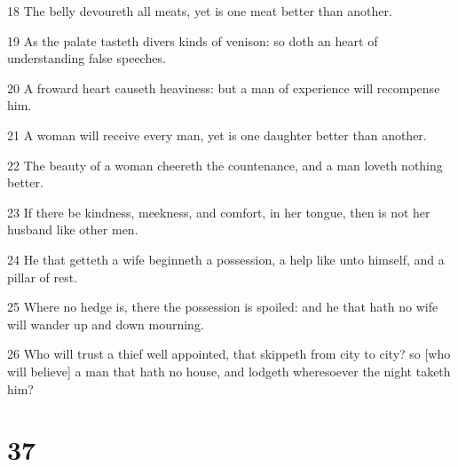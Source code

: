 \par 18 The belly devoureth all meats, yet is one meat better than another.
\par 19 As the palate tasteth divers kinds of venison: so doth an heart of understanding false speeches.
\par 20 A froward heart causeth heaviness: but a man of experience will recompense him.
\par 21 A woman will receive every man, yet is one daughter better than another.
\par 22 The beauty of a woman cheereth the countenance, and a man loveth nothing better.
\par 23 If there be kindness, meekness, and comfort, in her tongue, then is not her husband like other men.
\par 24 He that getteth a wife beginneth a possession, a help like unto himself, and a pillar of rest.
\par 25 Where no hedge is, there the possession is spoiled: and he that hath no wife will wander up and down mourning.
\par 26 Who will trust a thief well appointed, that skippeth from city to city? so [who will believe] a man that hath no house, and lodgeth wheresoever the night taketh him?

\chapter{37}

